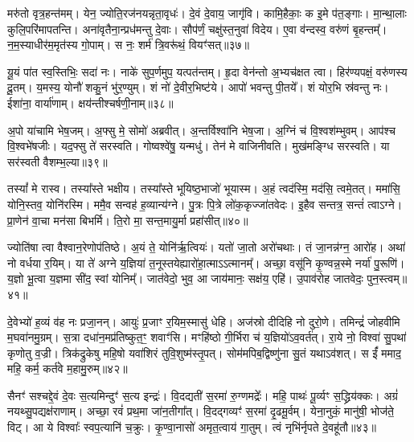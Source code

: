मरु॑तो वृत्र॒हन्त॑मम्।
येन॒ ज्योति॒रज॑नयन्नृता॒वृधः॑।
दे॒वं दे॒वाय॒ जागृ॑वि।
कामि॒हैकाः॒ क इ॒मे प॑त॒ङ्गाः।
मा॒न्था॒लाः कुलि॒परि॑मापतन्ति।
अना॑वृतैना॒न्प्रध॑मन्तु दे॒वाः।
सौप॑र्णं॒ चक्षु॑स्त॒नुवा॑ विदेय।
ए॒वा व॑न्दस्व॒ वरु॑णं बृ॒हन्तम्᳚।
न॒म॒स्याधीर॑म॒मृत॑स्य गो॒पाम्।
स नः॒ शर्म॑ त्रि॒वरू॑थं॒ वियꣳ॑सत्॥३७॥

यू॒यं पा॑त स्व॒स्तिभिः॒ सदा॑ नः।
नाके॑ सुप॒र्णमुप॒ यत्पत॑न्तम्।
हृ॒दा वेन॑न्तो अ॒भ्यच॑क्षत त्वा।
हिर॑ण्यपक्षं॒ वरु॑णस्य दू॒तम्।
य॒मस्य॒ योनौ॑ शकु॒नं भु॑र॒ण्युम्।
शं नो॑ दे॒वीर॒भिष्ट॑ये।
आपो॑ भवन्तु पी॒तये᳚।
शं योर॒भि स्र॑वन्तु नः।
ईशा॑ना॒ वार्या॑णाम्।
क्षय॑न्तीश्चर्\mbox{}षणी॒नाम्॥३८॥

अ॒पो या॑चामि भेष॒जम्।
अ॒फ्सु मे॒ सोमो॑ अब्रवीत्।
अ॒न्तर्विश्वा॑नि भेष॒जा।
अ॒ग्निं च॑ वि॒श्वश॑म्भुवम्।
आप॑श्च वि॒श्वभे॑षजीः।
यद॒फ्सु ते॑ सरस्वति।
गोष्वश्वे॑षु॒ यन्मधु॑।
तेन॑ मे वाजिनीवति।
मुख॑मङ्ग्धि सरस्वति।
या सर॑स्वती वैशम्भ॒ल्या॥३९॥

तस्यां᳚ मे रास्व।
तस्या᳚स्ते भक्षीय।
तस्या᳚स्ते भूयिष्ठ॒भाजो॑ भूयास्म।
अ॒हं त्वद॑स्मि॒ मद॑सि॒ त्वमे॒तत्।
ममा॑सि॒ योनि॒स्तव॒ योनि॑रस्मि।
ममै॒व सन्वह॑ ह॒व्यान्य॑ग्ने।
पु॒त्रः पि॒त्रे लो॑क॒कृज्जा॑तवेदः।
इ॒हैव सन्तत्र॒ सन्तं॑ त्वा\-ऽग्ने।
प्रा॒णेन॑ वा॒चा मन॑सा बिभर्मि।
ति॒रो मा॒ सन्त॒मायु॒र्मा प्रहा॑सीत्॥४०॥

ज्योति॑षा त्वा वैश्वान॒रेणोप॑तिष्ठे।
अ॒यं ते॒ योनि॑र्\mbox{}ऋ॒त्वियः॑।
यतो॑ जा॒तो अरो॑चथाः।
तं जा॒नन्न॑ग्न॒ आरो॑ह।
अथा॑ नो वर्धया र॒यिम्।
या ते॑ अग्ने य॒ज्ञिया॑ त॒नूस्तयेह्यारो॑हा॒त्मा\-ऽऽत्मानम्᳚।
अच्छा॒ वसू॑नि कृ॒ण्वन्न॒स्मे नर्या॑ पु॒रूणि॑।
य॒ज्ञो भू॒त्वा य॒ज्ञमा सी॑द॒ स्वां योनिम्᳚।
जात॑वेदो॒ भुव॒ आ जाय॑मानः॒ सक्ष॑य॒ एहि॑।
उ॒पाव॑रोह जातवेदः॒ पुन॒स्त्वम्॥४१॥

दे॒वेभ्यो॑ ह॒व्यं व॑ह नः प्रजा॒नन्।
आयुः॑ प्र॒जाꣳ र॒यिम॒स्मासु॑ धेहि।
अज॑स्रो दीदिहि नो दुरो॒णे।
तमिन्द्रं॑ जोहवीमि म॒घवा॑नमु॒ग्रम्।
स॒त्रा दधा॑न॒मप्र॑तिष्कुत॒ꣳ॒ शवाꣳ॑सि।
मꣳहि॑ष्ठो गी॒र्भिरा च॑ य॒ज्ञियो॑\-ऽव॒वर्त॑त्।
रा॒ये नो॒ विश्वा॑ सु॒पथा॑ कृणोतु व॒ज्री।
त्रिक॑द्रुकेषु महि॒षो यवा॑शिरं तुवि॒शुष्म॑स्तृ॒पत्।
सोम॑मपिब॒द्विष्णु॑ना सु॒तं यथा\-ऽव॑शत्।
स ईं᳚ ममाद॒ महि॒ कर्म॒ कर्त॑वे म॒हामु॒रुम्॥४२॥

सैनꣳ॑ सश्चद्दे॒वं दे॒वः स॒त्यमिन्दुꣳ॑ स॒त्य इन्द्रः॑।
वि॒दद्यती॑ स॒रमा॑ रु॒ग्णमद्रेः᳚।
महि॒ पाथः॑ पू॒र्व्यꣳ स॒द्ध्रिय॑क्कः।
अग्रं॑ नयथ्सु॒पद्यक्ष॑राणाम्।
अच्छा॒ रवं॑ प्रथ॒मा जा॑न॒तीगा᳚त्।
वि॒दद्गव्यꣳ॑ स॒रमा॑ दृ॒ढमू॒र्वम्।
येना॒नुकं॒ मानु॑षी॒ भोज॑ते॒ विट्।
आ ये विश्वाः᳚ स्वप॒त्यानि॑ च॒क्रुः।
कृ॒ण्वा॒नासो॑ अमृत॒त्वाय॑ गा॒तुम्।
त्वं नृभि॑र्नृपते दे॒वहू॑तौ॥४३॥

